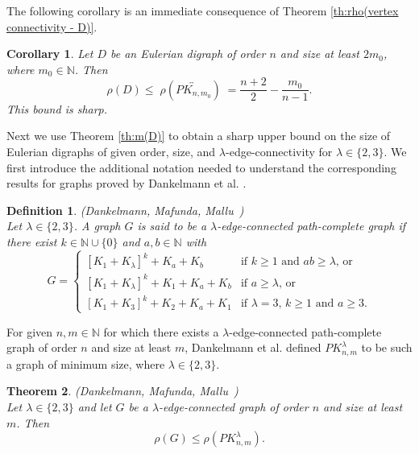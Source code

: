 \documentclass[a4paper,11pt]{article}
\newtheorem{theorem}{Theorem}[section]
\newtheorem{definition}{Definition}[section]
\newtheorem{corollary}[theorem]%
{Corollary}
\begin{document}
The following corollary is an immediate consequence of Theorem \ref{th:rho(vertex connectivity - D)}.

\begin{corollary}\label{coro:rho(D)}
Let $ D $ be an Eulerian digraph of order $ n $ and size at least $ 2m_{0} $, where $m_0 \in \mathbb{N}$. Then 
\[\rho(D) \leq \; \rho(\overleftrightarrow{PK_{n,m_0}}) \; = \dfrac{n+2}{2}-\dfrac{m_0}{n-1}. \]
This bound is sharp.
\end{corollary}
 
Next we use Theorem \ref{th:m(D)} to obtain a sharp upper bound on the size of Eulerian digraphs of given order, size, and $\lambda$-edge-connectivity for $\lambda \in \{2,3\}$. We first introduce the additional notation needed to understand the corresponding results for graphs proved by Dankelmann et al. \cite{DanMafMal2025}.
 


\begin{definition}\label{deflambda}
{\rm (Dankelmann, Mafunda, Mallu~\cite{DanMafMal2025})}\\
Let $\lambda\in\{2,3\}$. A graph $G$ is said to be a $\lambda$-edge-connected path-complete graph if there exist
$k \in \mathbb{N}\cup\{0\}$ and  $a, b \in \mathbb{N}$ with
\[ G = \left\{ \begin{array}{cc}        
  \left[K_{1}+K_{\lambda}\right]^{k}+K_{a}+K_{b} 
  & \textrm{if $k \geq 1$ and $ab \geq \lambda$, or}\\
  \left[K_{1}+K_{\lambda}\right]^{k}+K_{1}+K_{a}+K_{b} 
& \textrm{if $a \geq \lambda$, or}\\ 
\left[K_1 + K_3\right]^k + K_2 + K_a + K_1 
& \textrm{if $\lambda=3$, $k \geq 1$ and $a \geq 3$.}          
 \end{array} \right. \]
\end{definition}

For given $n,m \in \mathbb{N}$ for which there exists a $\lambda$-edge-connected path-complete graph of order $n$ and size at least $m$, Dankelmann et al. \cite{DanMafMal2025} defined $PK_{n,m}^{\lambda}$ to be such a graph of minimum size, where  $\lambda\in\{2,3\}$.

\begin{theorem} \label{theo: remoteness of edge connectivity}
{\rm (Dankelmann, Mafunda, Mallu~\cite{DanMafMal2025})}\\
Let $\lambda \in \{2,3\}$ and let $G$ be a $\lambda$-edge-connected graph of order $n$ and size at least $m$. Then 
\[ \rho(G) \leq \rho(PK^{\lambda}_{n,m}). \]
\end{theorem}
\end{document}
